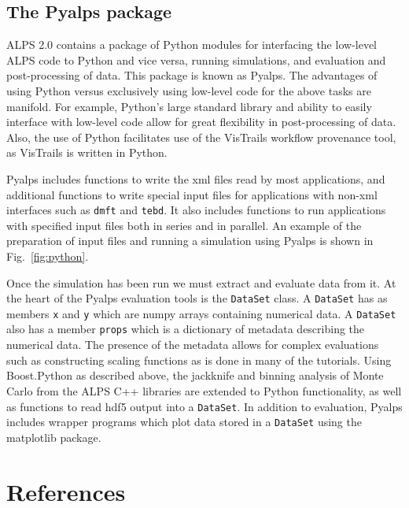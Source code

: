 \documentclass[12pt]{iopart}
\begin{document}
\subsection{The Pyalps package}
ALPS 2.0 contains a package of Python modules for interfacing the low-level ALPS code to Python and vice versa, running simulations, and evaluation and post-processing of data.  This package is known as Pyalps.  The advantages of using Python versus exclusively using low-level code for the above tasks are manifold.  For example, Python's large standard library and ability to easily interface with low-level code allow for great flexibility in post-processing of data.  Also, the use of Python facilitates use of the VisTrails workflow provenance tool, as VisTrails is written in Python.

Pyalps includes functions to write the xml files read by most applications, and additional functions to write special input files for applications with non-xml interfaces such as {\tt dmft} and {\tt tebd}.  It also includes functions to run applications with specified input files both in series and in parallel.  An example of the preparation of input files and running a simulation using Pyalps is shown in Fig.~\ref{fig:python}.

Once the simulation has been run we must extract and evaluate data from it.  At the heart of the Pyalps evaluation tools is the {\tt DataSet} class.  A {\tt DataSet} has as members {\tt x} and {\tt y} which are numpy arrays containing numerical data.  A {\tt DataSet} also has a member {\tt props} which is a dictionary of metadata describing the numerical data.  The presence of the metadata allows for complex evaluations such as constructing scaling functions as is done in many of the tutorials.  Using Boost.Python as described above, the jackknife and binning analysis of Monte Carlo from the ALPS C++ libraries are extended to Python functionality, as well as functions to read hdf5 output into a {\tt DataSet}.  In addition to evaluation, Pyalps includes wrapper programs which plot data stored in a {\tt DataSet} using the matplotlib package.


\section*{References}



\end{document}
